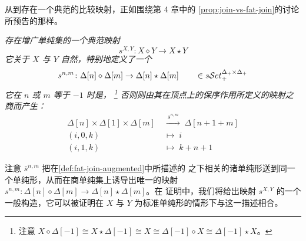 从\trFatJoin{}到\trJoin{}存在一个典范的比较映射，正如围绕第 4 章中的%
\cref{prop:join-vs-fat-join}的讨论所预告的那样。

\begin{lemma}\label{lem:fat-join-comparison}
\emph{存在增广单纯集的一个典范映射
\begin{equation*}
s^{X,Y}\colon X\diamond Y\to X\star Y
\end{equation*}
它关于 $X$ 与 $Y$ 自然，特别地定义了一个\trNaturalTransformation
\begin{equation*}
s^{n,m}\colon\Delta[n]\diamond\Delta[m]\to\Delta[n]\star\Delta[m]
\qquad\in s\mathcal{S}et_{+}^{\Delta_{+}\times\Delta_{+}}
\end{equation*}
它在 $n$ 或 $m$ 等于 $-1$ 时是\trIsomorphism，%
\footnote{注意
$X\diamond\Delta[-1]\cong X\star\Delta[-1]\cong X\cong\Delta[-1]\diamond X\cong\Delta[-1]\star X$。}
否则则由其在顶点上的保序作用所定义的映射之商而产生：}
\begin{equation*}
\begin{aligned}
\Delta[n]\times\Delta[1]\times\Delta[m]
&\;\xrightarrow{\ \bar{s}^{n,m}\ }\;
\Delta[n+1+m]\\
(i,0,k)&\;\longmapsto\; i\\
(i,1,k)&\;\longmapsto\; k+n+1
\end{aligned}
\end{equation*}
\end{lemma}

注意 $\bar{s}^{n,m}$ 把在\cref{def:fat-join-augmented}中所描述的\trCongruence{}%
之下相关的诸单纯形送到同一个单纯形，从而在商单纯集上诱导出唯一的映射%
$s^{n,m}\colon\Delta[n]\diamond\Delta[m]\to\Delta[n]\star\Delta[m]$。在%
证明中，我们将给出映射 $s^{X,Y}$ 的一个一般构造，它可以被证明在 $X$ 与%
$Y$ 为标准单纯形的情形下与这一描述相合。

